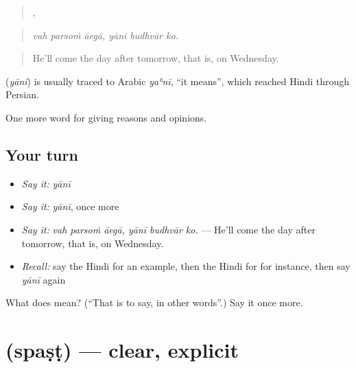 \begin{quote}
  ,   
\end{quote}

\begin{quote}
\emph{vah parsoṁ āegā, yānī budhvār ko.}
\end{quote}

\begin{quote}
He'll come the day after tomorrow, that is, on Wednesday.
\end{quote}

\begin{cousinweb}
\textbf{} (\emph{yānī}) is usually traced to Arabic \emph{yaʿnī}, \textquotedblleft{}it means\textquotedblright{}, which reached Hindi through Persian.
\end{cousinweb}

\begin{grammarlens}[title={What you've built}]
One more word for giving reasons and opinions.
\end{grammarlens}

\subsection*{Your turn}
\begin{itemize}
\raggedright
  \item \emph{Say it:} \emph{yānī}
  \item \emph{Say it:} \emph{yānī}, once more
  \item \emph{Say it:} \emph{vah parsoṁ āegā, yānī budhvār ko.} — He'll come the day after tomorrow, that is, on Wednesday.
  \item \emph{Recall:} say the Hindi for an example, then the Hindi for for instance, then say \emph{yānī} again
\end{itemize}

\begin{tcolorbox}[breakable,colback=teal!4,colframe=teal!35!black,title={Before you move on}]
What does  mean? (\textquotedblleft{}That is to say, in other words\textquotedblright{}.) Say it once more.
\end{tcolorbox}
\section[\texorpdfstring{\hi{स्पष्ट} (spaṣṭ)}{स्पष्ट (spaṣṭ)}]{ (spaṣṭ) — clear, explicit}

\label{lesson:HI-C350-spast}



